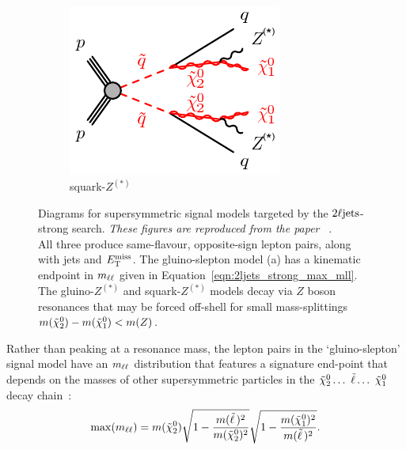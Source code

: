 \begin{figure}[tp]
\begin{subfigure}{0.48\textwidth}
\centering
\includegraphics[width=\textwidth]{figures/2ljets_strong_sqsq_qqZZN1N1.pdf}
\caption{squark-$Z^{(*)}$}
\end{subfigure}
\caption[
Diagrams for supersymmetric signal models targeted by the $\twoljets$-strong
search
]{%
Diagrams for supersymmetric signal models targeted by the $\twoljets$-strong
search.
\emph{These figures are reproduced from the paper%
}~\cite{atlas2022searches, atlas_susy_feynman}.
\\[0.5em]
All three produce same-flavour, opposite-sign lepton pairs, along with jets
and $E_\mathrm{T}^\mathrm{miss}$.
The gluino-slepton model (a) has a kinematic endpoint in $m_{\ell\ell}$
given in Equation~\ref{eqn:2ljets_strong_max_mll}.
The gluino-$Z^{(*)}$ and squark-$Z^{(*)}$ models decay via $Z$ boson
resonances that may be forced off-shell for small mass-splittings
$m(\tilde\chi^0_2) - m(\tilde\chi^0_1) < m(Z)$.
}
\label{fig:2ljets_strong_signal_diagrams}
\end{figure}

Rather than peaking at a resonance mass, the lepton pairs in the
`gluino-slepton' signal model have an $m_{\ell\ell}$ distribution that features a
signature end-point that depends on the masses of other supersymmetric
particles in the
$\neutralino_2 \ldots\ \slepton \ldots\ \neutralino_1$
decay chain~\cite{paige1996determining}:
\begin{equation}
\label{eqn:2ljets_strong_max_mll}
\max(m_{\ell\ell})
= m(\tilde\chi^0_2)
\sqrt{1 - \frac{m(\tilde\ell\,)^2}{m(\tilde\chi^0_2)^2}}
\sqrt{1 - \frac{m(\tilde\chi^0_1)^2}{m(\tilde\ell\,)^2}}
.
\end{equation}

